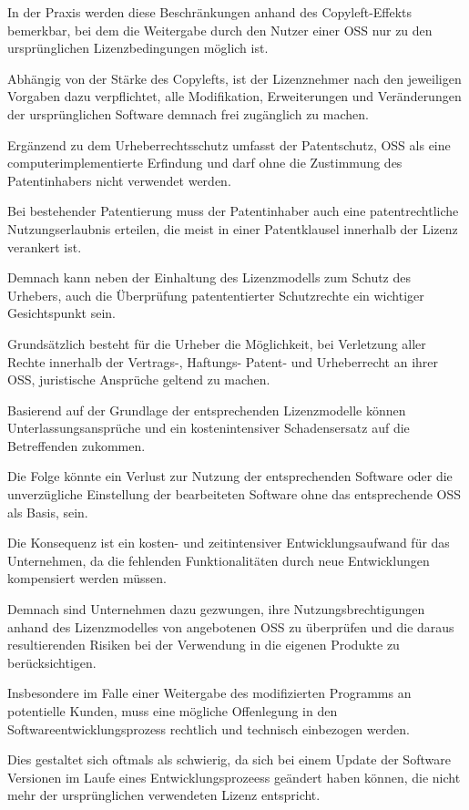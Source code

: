 In der Praxis werden diese Beschränkungen anhand des Copyleft-Effekts bemerkbar, bei dem die Weitergabe durch den Nutzer einer OSS nur zu den ursprünglichen Lizenzbedingungen möglich ist.\cite[S. 184]{sujecki__2005}  

Abhängig von der Stärke des Copylefts, ist der Lizenznehmer nach den jeweiligen Vorgaben dazu verpflichtet, alle Modifikation, Erweiterungen und Veränderungen der ursprünglichen Software demnach frei zugänglich zu machen.

Ergänzend zu dem Urheberrechtsschutz umfasst der Patentschutz, OSS als eine computerimplementierte Erfindung und darf ohne die Zustimmung des Patentinhabers nicht verwendet werden.

Bei bestehender Patentierung muss der Patentinhaber auch eine patentrechtliche Nutzungserlaubnis erteilen, die meist in einer Patentklausel innerhalb der Lizenz verankert ist. 

Demnach kann neben der Einhaltung des Lizenzmodells zum Schutz des Urhebers, auch die Überprüfung patententierter Schutzrechte ein wichtiger Gesichtspunkt sein.   

Grundsätzlich besteht für die Urheber die Möglichkeit, bei Verletzung aller Rechte innerhalb der Vertrags-, Haftungs- Patent- und Urheberrecht an ihrer OSS, juristische Ansprüche geltend zu machen.

Basierend auf der Grundlage der entsprechenden Lizenzmodelle können Unterlassungsansprüche und ein kostenintensiver Schadensersatz auf die Betreffenden zukommen.\cite{helmreich_geschaftsrisiken_2012}

Die Folge könnte ein Verlust zur Nutzung der entsprechenden Software oder die unverzügliche Einstellung der bearbeiteten Software ohne das entsprechende OSS als Basis, sein. 

Die Konsequenz ist ein kosten- und zeitintensiver Entwicklungsaufwand für das Unternehmen, da die fehlenden Funktionalitäten durch neue Entwicklungen kompensiert werden müssen. 

Demnach sind Unternehmen dazu gezwungen, ihre Nutzungsbrechtigungen anhand des Lizenzmodelles von angebotenen OSS zu überprüfen und die daraus resultierenden Risiken bei der Verwendung in die eigenen Produkte zu berücksichtigen.  

Insbesondere im Falle einer Weitergabe des modifizierten Programms an potentielle Kunden, muss eine mögliche Offenlegung in den Softwareentwicklungsprozess rechtlich und technisch einbezogen werden.  

Dies gestaltet sich oftmals als schwierig, da sich bei einem Update der Software Versionen im Laufe eines Entwicklungsprozeess geändert haben können, die nicht mehr der ursprünglichen verwendeten Lizenz entspricht.

